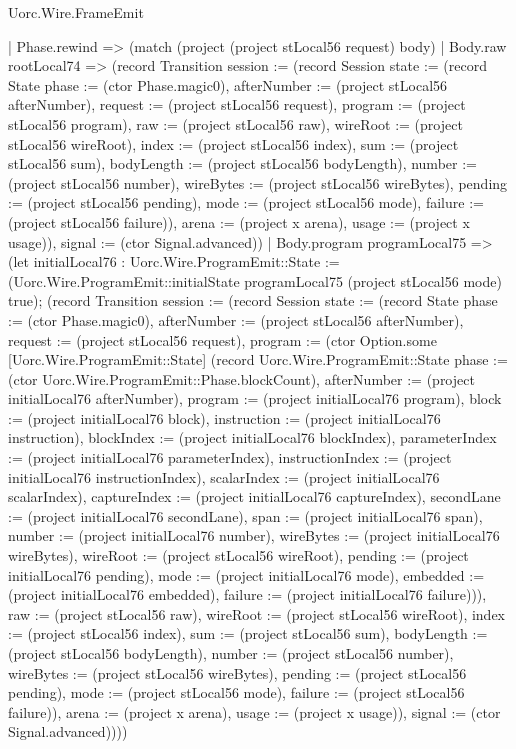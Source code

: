 \begin{lexlean}{Uorc.Wire.FrameEmit}
\begin{semanticmodule}
{        | Phase.rewind => (match (project (project stLocal56 request) body)
          | Body.raw rootLocal74 => (record Transition {session := (record Session {state := (record State {phase := (ctor Phase.magic0), afterNumber := (project stLocal56 afterNumber), request := (project stLocal56 request), program := (project stLocal56 program), raw := (project stLocal56 raw), wireRoot := (project stLocal56 wireRoot), index := (project stLocal56 index), sum := (project stLocal56 sum), bodyLength := (project stLocal56 bodyLength), number := (project stLocal56 number), wireBytes := (project stLocal56 wireBytes), pending := (project stLocal56 pending), mode := (project stLocal56 mode), failure := (project stLocal56 failure)}), arena := (project x arena), usage := (project x usage)}), signal := (ctor Signal.advanced)})
          | Body.program programLocal75 => (let initialLocal76 : Uorc.Wire.ProgramEmit::State := (Uorc.Wire.ProgramEmit::initialState programLocal75 (project stLocal56 mode) true); (record Transition {session := (record Session {state := (record State {phase := (ctor Phase.magic0), afterNumber := (project stLocal56 afterNumber), request := (project stLocal56 request), program := (ctor Option.some [Uorc.Wire.ProgramEmit::State] (record Uorc.Wire.ProgramEmit::State {phase := (ctor Uorc.Wire.ProgramEmit::Phase.blockCount), afterNumber := (project initialLocal76 afterNumber), program := (project initialLocal76 program), block := (project initialLocal76 block), instruction := (project initialLocal76 instruction), blockIndex := (project initialLocal76 blockIndex), parameterIndex := (project initialLocal76 parameterIndex), instructionIndex := (project initialLocal76 instructionIndex), scalarIndex := (project initialLocal76 scalarIndex), captureIndex := (project initialLocal76 captureIndex), secondLane := (project initialLocal76 secondLane), span := (project initialLocal76 span), number := (project initialLocal76 number), wireBytes := (project initialLocal76 wireBytes), wireRoot := (project stLocal56 wireRoot), pending := (project initialLocal76 pending), mode := (project initialLocal76 mode), embedded := (project initialLocal76 embedded), failure := (project initialLocal76 failure)})), raw := (project stLocal56 raw), wireRoot := (project stLocal56 wireRoot), index := (project stLocal56 index), sum := (project stLocal56 sum), bodyLength := (project stLocal56 bodyLength), number := (project stLocal56 number), wireBytes := (project stLocal56 wireBytes), pending := (project stLocal56 pending), mode := (project stLocal56 mode), failure := (project stLocal56 failure)}), arena := (project x arena), usage := (project x usage)}), signal := (ctor Signal.advanced)})))
}
\end{semanticmodule}
\end{lexlean}
